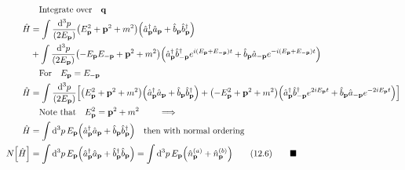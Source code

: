 \documentclass{article}
\begin{document}
\begin{align*}
                    & \qq{Integrate over}\vb{q}                                                                                                                                                                                                                                                                                                           \\
    \hat{H}         & =\int \frac{\dd[3]{p}}{(2E_{\vb{p}})}\pqty{E_{\vb{p}}^2+\vb{p}^2+m^2}\pqty{\hat{a}^\dagger_{\vb{p}}\hat{a}_{\vb{p}}+\hat{b}_{\vb{p}}\hat{b}^\dagger_{\vb{p}}}                                                                                                                                                                       \\
                    & +\int \frac{\dd[3]{p}}{(2E_{\vb{p}})}\pqty{-E_{\vb{p}}E_{\vb{-p}}+\vb{p}^2+m^2}\pqty{\hat{a}^\dagger_{\vb{p}}\hat{b}^\dagger_{\vb{-p}}e^{i(E_{\vb{p}}+E_{\vb{-p}})t}+\hat{b}_{\vb{p}}\hat{a}_{\vb{-p}}e^{-i(E_{\vb{p}}+E_{\vb{-p}})t}}                                                                                              \\
                    & \qq{For} E_{\vb{p}}=E_{\vb{-p}}                                                                                                                                                                                                                                                                                                     \\
    \hat{H}         & =\int \frac{\dd[3]{p}}{(2E_{\vb{p}})}\bqty{\pqty{E_{\vb{p}}^2+\vb{p}^2+m^2}\pqty{\hat{a}^\dagger_{\vb{p}}\hat{a}_{\vb{p}}+\hat{b}_{\vb{p}}\hat{b}^\dagger_{\vb{p}}}+\pqty{-E_{\vb{p}}^2+\vb{p}^2+m^2}\pqty{\hat{a}^\dagger_{\vb{p}}\hat{b}^\dagger_{\vb{-p}}e^{2iE_{\vb{p}}t}+\hat{b}_{\vb{p}}\hat{a}_{\vb{-p}}e^{-2iE_{\vb{p}}t}}} \\
                    & \qq{Note that}E_{\vb{p}}^2=\vb{p}^2+m^2\qquad\implies                                                                                                                                                                                                                                                                               \\
    \hat{H}         & =\int\dd[3]{p}E_{\vb{p}}\pqty{\hat{a}^\dagger_{\vb{p}}\hat{a}_{\vb{p}}+\hat{b}_{\vb{p}}\hat{b}^\dagger_{\vb{p}}}\qq{then with normal ordering}                                                                                                                                                                                      \\
    N\bqty{\hat{H}} & =\int\dd[3]{p}E_{\vb{p}}\pqty{\hat{a}^\dagger_{\vb{p}}\hat{a}_{\vb{p}}+\hat{b}^\dagger_{\vb{p}}\hat{b}_{\vb{p}}}=\int\dd[3]{p}E_{\vb{p}}\pqty{\hat{n}^{(a)}_{\vb{p}}+\hat{n}^{(b)}_{\vb{p}}}\qquad(12.6)\qquad\blacksquare
\end{align*}
\end{document}
